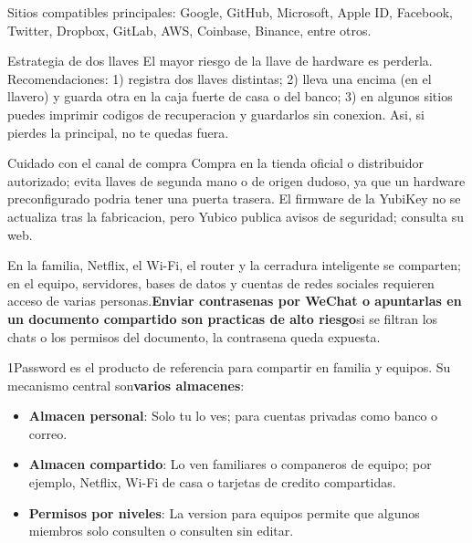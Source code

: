 Sitios compatibles principales: Google, GitHub, Microsoft, Apple ID, Facebook, Twitter, Dropbox, GitLab, AWS, Coinbase, Binance, entre otros.

\begin{tcbinfo}{Estrategia de dos llaves}
El mayor riesgo de la llave de hardware es perderla. Recomendaciones: 1) registra dos llaves distintas; 2) lleva una encima (en el llavero) y guarda otra en la caja fuerte de casa o del banco; 3) en algunos sitios puedes imprimir codigos de recuperacion y guardarlos sin conexion. Asi, si pierdes la principal, no te quedas fuera.

\end{tcbinfo}

\begin{tcbwarn}{Cuidado con el canal de compra}
Compra en la tienda oficial o distribuidor autorizado; evita llaves de segunda mano o de origen dudoso, ya que un hardware preconfigurado podria tener una puerta trasera. El firmware de la YubiKey no se actualiza tras la fabricacion, pero Yubico publica avisos de seguridad; consulta su web.

\end{tcbwarn}


En la familia, Netflix, el Wi-Fi, el router y la cerradura inteligente se comparten; en el equipo, servidores, bases de datos y cuentas de redes sociales requieren acceso de varias personas.\textbf{Enviar contrasenas por WeChat o apuntarlas en un documento compartido son practicas de alto riesgo}si se filtran los chats o los permisos del documento, la contrasena queda expuesta.


1Password es el producto de referencia para compartir en familia y equipos. Su mecanismo central son\textbf{varios almacenes}:

\begin{itemize}
  \item \textbf{Almacen personal}: Solo tu lo ves; para cuentas privadas como banco o correo.
  \item \textbf{Almacen compartido}: Lo ven familiares o companeros de equipo; por ejemplo, Netflix, Wi-Fi de casa o tarjetas de credito compartidas.
  \item \textbf{Permisos por niveles}: La version para equipos permite que algunos miembros solo consulten o consulten sin editar.
\end{itemize}


